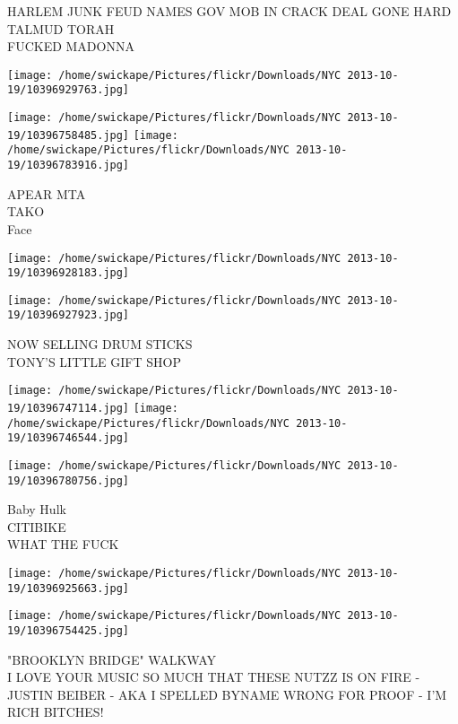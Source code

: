 \documentclass[10pt,letterpaper]{article}
\begin{document}
HARLEM JUNK FEUD NAMES GOV MOB IN CRACK DEAL GONE HARD\\
TALMUD TORAH\\
FUCKED MADONNA\\
\pagebreak

\texttt{[image: /home/swickape/Pictures/flickr/Downloads/NYC 2013-10-19/10396929763.jpg]}

\vspace{0.25in}
\texttt{[image: /home/swickape/Pictures/flickr/Downloads/NYC 2013-10-19/10396758485.jpg]}
\texttt{[image: /home/swickape/Pictures/flickr/Downloads/NYC 2013-10-19/10396783916.jpg]}

APEAR MTA\\
TAKO\\
Face\\
\pagebreak

\texttt{[image: /home/swickape/Pictures/flickr/Downloads/NYC 2013-10-19/10396928183.jpg]}

\vspace{0.25in}
\texttt{[image: /home/swickape/Pictures/flickr/Downloads/NYC 2013-10-19/10396927923.jpg]}

NOW SELLING DRUM STICKS\\
TONY'S LITTLE GIFT SHOP\\
\pagebreak

\texttt{[image: /home/swickape/Pictures/flickr/Downloads/NYC 2013-10-19/10396747114.jpg]}
\texttt{[image: /home/swickape/Pictures/flickr/Downloads/NYC 2013-10-19/10396746544.jpg]}

\texttt{[image: /home/swickape/Pictures/flickr/Downloads/NYC 2013-10-19/10396780756.jpg]}

Baby Hulk\\
CITIBIKE\\
WHAT THE FUCK\\
\pagebreak

\texttt{[image: /home/swickape/Pictures/flickr/Downloads/NYC 2013-10-19/10396925663.jpg]}

\vspace{0.25in}
\texttt{[image: /home/swickape/Pictures/flickr/Downloads/NYC 2013-10-19/10396754425.jpg]}

"BROOKLYN BRIDGE" WALKWAY\\
I LOVE YOUR MUSIC SO MUCH THAT THESE NUTZZ IS ON FIRE {-} JUSTIN BEIBER {-} AKA I SPELLED BYNAME WRONG FOR PROOF {-} I'M RICH BITCHES!\\
\pagebreak
\end{document}
